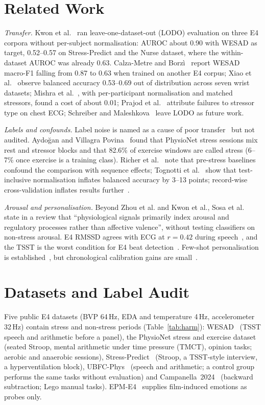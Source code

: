 \documentclass[journal]{IEEEtran}
\begin{document}
\section{Related Work}
\emph{Transfer.} Kwon et al.~\cite{kwon2026} ran leave-one-dataset-out (LODO) evaluation on three E4 corpora without per-subject normalisation: AUROC about 0.90 with WESAD as target, 0.52--0.57 on Stress-Predict and the Nurse dataset, where the within-dataset AUROC was already 0.63. Calza-Metre and Borz\`i~\cite{calzametre2026} report WESAD macro-F1 falling from 0.87 to 0.63 when trained on another E4 corpus; Xiao et al.~\cite{xiao2025} observe balanced accuracy 0.53--0.69 out of distribution across seven wrist datasets; Mishra et al.~\cite{mishra2020}, with per-participant normalisation and matched stressors, found a cost of about 0.01; Prajod et al.~\cite{prajod2024} attribute failures to stressor type on chest ECG; Schreiber and Maleshkova~\cite{schreiber2026} leave LODO as future work.

\emph{Labels and confounds.} Label noise is named as a cause of poor transfer~\cite{kwon2026,singh2026feel} but not audited. Aydo\u{g}an and Villagra Povina~\cite{aydogan2026} found that PhysioNet stress sessions mix rest and stressor blocks and that 82.6\% of exercise windows are called stress (6--7\% once exercise is a training class). Richer et al.~\cite{richer2024} note that pre-stress baselines confound the comparison with sequence effects; Tognotti et al.~\cite{tognotti2026} show that test-inclusive normalisation inflates balanced accuracy by 3--13 points; record-wise cross-validation inflates results further~\cite{saeb2017,bahameish2024}.

\emph{Arousal and personalisation.} Beyond Zhou et al. and Kwon et al., Sosa et al.~\cite{sosa2026} state in a review that ``physiological signals primarily index arousal and regulatory processes rather than affective valence'', without testing classifiers on non-stress arousal. E4 RMSSD agrees with ECG at $r=0.42$ during speech~\cite{milstein2020}, and the TSST is the worst condition for E4 beat detection~\cite{watanabe2025}. Few-shot personalisation is established~\cite{stewart2020,han2024}, but chronological calibration gains are small~\cite{tervonen2026,akkaya2026}.

\section{Datasets and Label Audit}
Five public E4 datasets (BVP 64\,Hz, EDA and temperature 4\,Hz, accelerometer 32\,Hz) contain stress and non-stress periods (Table~\ref{tab:harm}): WESAD~\cite{schmidt2018wesad} (TSST speech and arithmetic before a panel), the PhysioNet stress and exercise dataset~\cite{hongn2025data} (seated Stroop, mental arithmetic under time pressure (TMCT), opinion tasks; aerobic and anaerobic sessions), Stress-Predict~\cite{iqbal2022} (Stroop, a TSST-style interview, a hyperventilation block), UBFC-Phys~\cite{meziati2023} (speech and arithmetic; a control group performs the same tasks without evaluation) and Campanella~2024~\cite{campanella2024} (backward subtraction; Lego manual tasks). EPM-E4~\cite{garcia2020epm} supplies film-induced emotions as probes only.
\end{document}
